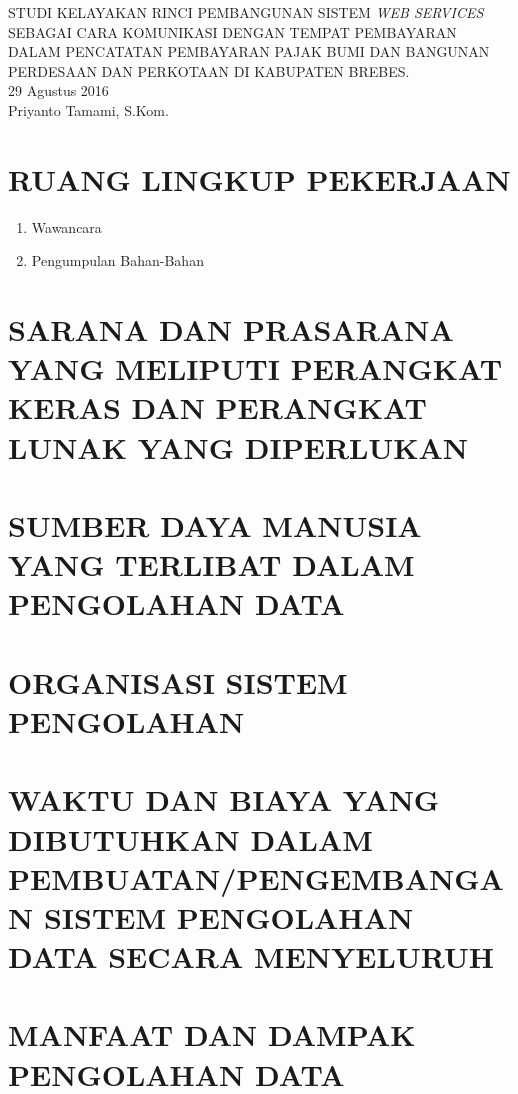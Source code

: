 \documentclass[pdftex,12pt, oneside]{article}
\begin{document}
\sloppy %

\begin{center}
{\large STUDI KELAYAKAN RINCI PEMBANGUNAN SISTEM \textit{WEB SERVICES} SEBAGAI CARA KOMUNIKASI DENGAN TEMPAT PEMBAYARAN DALAM PENCATATAN PEMBAYARAN PAJAK BUMI DAN BANGUNAN PERDESAAN DAN PERKOTAAN DI KABUPATEN BREBES.}
\\[1cm]
29 Agustus 2016\\
Priyanto Tamami, S.Kom.
\end{center}




\section{RUANG LINGKUP PEKERJAAN}




\begin{enumerate}[1.]
\item Wawancara


\item Pengumpulan Bahan-Bahan

\end{enumerate}

\section{SARANA DAN PRASARANA YANG MELIPUTI PERANGKAT KERAS DAN PERANGKAT LUNAK YANG DIPERLUKAN}


\section{SUMBER DAYA MANUSIA YANG TERLIBAT DALAM PENGOLAHAN DATA}


\section{ORGANISASI SISTEM PENGOLAHAN}


\section{WAKTU DAN BIAYA YANG DIBUTUHKAN DALAM PEMBUATAN/PENGEMBANGAN SISTEM PENGOLAHAN DATA SECARA MENYELURUH}


\section{MANFAAT DAN DAMPAK PENGOLAHAN DATA}
\end{document}
